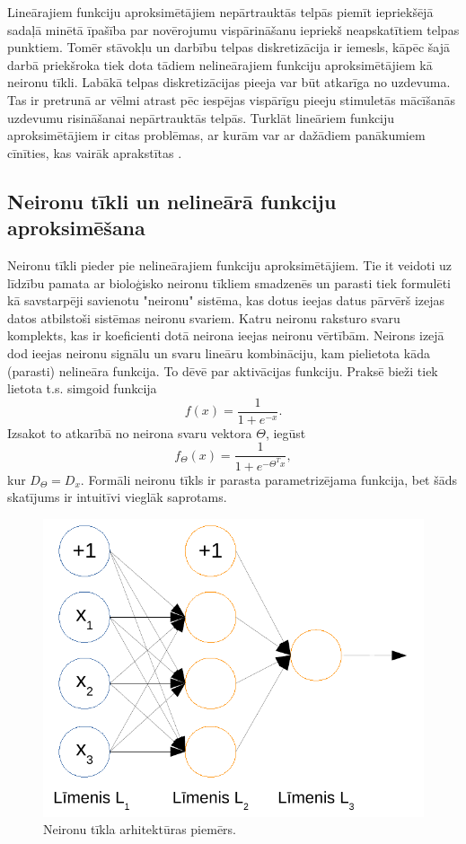 \documentclass{ludis} %
\begin{document}
Lineārajiem funkciju aproksimētājiem nepārtrauktās telpās piemīt iepriekšējā sadaļā minētā īpašība par novērojumu vispārināšanu iepriekš neapskatītiem telpas punktiem.
Tomēr stāvokļu un darbību telpas diskretizācija ir iemesls, kāpēc šajā darbā priekšroka tiek dota tādiem nelineārajiem funkciju aproksimētājiem kā neironu tīkli.
Labākā telpas diskretizācijas pieeja var būt atkarīga no uzdevuma.
Tas ir pretrunā ar vēlmi atrast pēc iespējas vispārīgu pieeju stimuletās mācīšanās uzdevumu risināšanai nepārtrauktās telpās.
Turklāt lineāriem funkciju aproksimētājiem ir citas problēmas, ar kurām var ar dažādiem panākumiem cīnīties, kas vairāk aprakstītas \autocite{Hasselt2012} .

\subsection{Neironu tīkli un nelineārā funkciju aproksimēšana}
Neironu tīkli pieder pie nelineārajiem funkciju aproksimētājiem.
Tie it veidoti uz līdzību pamata ar bioloģisko neironu tīkliem smadzenēs un parasti tiek formulēti kā savstarpēji savienotu "neironu" sistēma, kas dotus ieejas datus pārvērš izejas datos atbilstoši sistēmas neironu svariem.
Katru neironu raksturo svaru komplekts, kas ir koeficienti dotā neirona ieejas neironu vērtībām.
Neirons izejā dod ieejas neironu signālu un svaru lineāru kombināciju, kam pielietota kāda (parasti) nelineāra funkcija. To dēvē par aktivācijas funkciju.
Praksē bieži tiek lietota t.s. simgoid funkcija
\[
	f(x) = \frac{1}{1 + e^{-x}}.
\]
Izsakot to atkarībā no neirona svaru vektora $\Theta$, iegūst
\[
	f_\Theta(x) = \frac{1}{1 + e^{-\Theta^T x}},
\]
kur $D_\Theta = D_x$. Formāli neironu tīkls ir parasta parametrizējama funkcija, bet šāds skatījums ir intuitīvi vieglāk saprotams.

\begin{figure}
	\centering
	\includegraphics{Img/nn-arhitektura.pdf}
	\caption{Neironu tīkla arhitektūras piemērs.}
	\label{fig:nn}
\end{figure}
\end{document}
